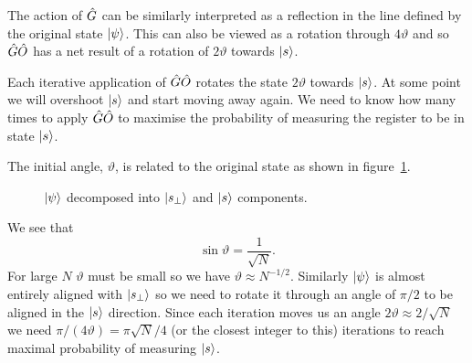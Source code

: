     The action of \(\hat{G}\) can be similarly interpreted as a reflection in the line defined by the original state \(\vert {\psi} \rangle\).
    This can also be viewed as a rotation through \(4\vartheta\) and so \(\hat{G}\hat{O}\) has a net result of a rotation of \(2\vartheta\) towards \(\vert {s} \rangle\).
    
    Each iterative application of \(\hat{G}\hat{O}\) rotates the state \(2\vartheta\) towards \(\vert {s} \rangle\).
    At some point we will overshoot \(\vert {s} \rangle\) and start moving away again.
    We need to know how many times to apply \(\hat{G}\hat{O}\) to maximise the probability of measuring the register to be in state \(\vert {s} \rangle\).
    
    The initial angle, \(\vartheta\), is related to the original state as shown in figure~\ref{fig:relation between s, psi, and theta}.
    \begin{figure}[ht]
        \centering
        \caption{\(\vert {\psi} \rangle\) decomposed into \(\vert {s_\perp} \rangle\) and \(\vert {s} \rangle\) components.}
        \label{fig:relation between s, psi, and theta}
    \end{figure}
    We see that
    \[\sin\vartheta = \frac{1}{\sqrt{N}}.\]
    For large \(N\) \(\vartheta\) must be small so we have \(\vartheta\approx N^{-1/2}\).
    Similarly \(\vert {\psi} \rangle\) is almost entirely aligned with \(\vert {s_\perp} \rangle\) so we need to rotate it through an angle of \(\pi/2\) to be aligned in the \(\vert {s} \rangle\) direction.
    Since each iteration moves us an angle \(2\vartheta \approx 2/\sqrt{N}\) we need \(\pi/(4\vartheta) = \pi\sqrt{N}/4\) (or the closest integer to this) iterations  to reach maximal probability of measuring \(\vert {s} \rangle\).
    
